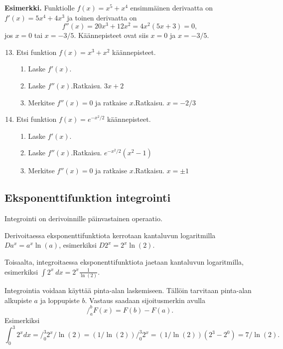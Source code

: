 \documentclass[10pt]{article}
\newcommand{\ratkaisu}[1]{\hfill{\color{blue}\quad\textrm{Ratkaisu. } #1}}
\begin{document}
\textbf{Esimerkki.} Funktiolle $f(x)=x^5+x^4$ ensimmäinen derivaatta on $f'(x)=5x^4+4x^3$ ja toinen derivaatta on
$$
f''(x)=20x^3+12x^2
=4x^2(5x+3)=0,
$$
jos $x=0$ tai $x=-3/5$. Käännepisteet ovat siis $x=0$ ja $x=-3/5$.

\begin{enumerate}
\setcounter{enumi}{12}
\item Etsi funktion $f(x)=x^3+x^2$ käännepisteet.
\begin{enumerate}
\item Laske $f'(x)$.
\item Laske $f''(x)$.\ratkaisu{$3x+2$}
\item Merkitse $f''(x)=0$ ja ratkaise $x$.\ratkaisu{$x=-2/3$}
\end{enumerate}
\item Etsi funktion $f(x)=e^{-x^2/2}$ käännepisteet.
\begin{enumerate}
\item Laske $f'(x)$.
\item Laske $f''(x)$.\ratkaisu{$e^{-x^2/2}(x^2-1)$}
\item Merkitse $f''(x)=0$ ja ratkaise $x$.\ratkaisu{$x=\pm1$}
\end{enumerate}
\end{enumerate}

\newpage

\subsection{Eksponenttifunktion integrointi}

Integrointi on derivoinnille päinvastainen operaatio.

Derivoitaessa eksponenttifunktiota kerrotaan kantaluvun logaritmilla $D a^x=a^x\ln(a)$, esimerkiksi $D2^x=2^x\ln(2)$.

Toisaalta, integroitaessa eksponenttifunktiota jaetaan kantaluvun logaritmilla, esimerkiksi $\int 2^x~dx=2^x\frac{1}{\ln(2)}$.

Integrointia voidaan käyttää pinta-alan laskemiseen. Tällöin tarvitaan pinta-alan alkupiste $a$ ja loppupiste $b$. Vastaus saadaan sijoitusmerkin avulla
$$
\bigg /_a^b F(x)=F(b)-F(a).
$$
Esimerkiksi
$$
\int_0^3 2^x dx=\bigg /_0^3 2^x/\ln(2)
=(1/\ln(2))\bigg /_0^3 2^x
=(1/\ln(2))(2^3-2^0)
=7/\ln(2).
$$
\end{document}

